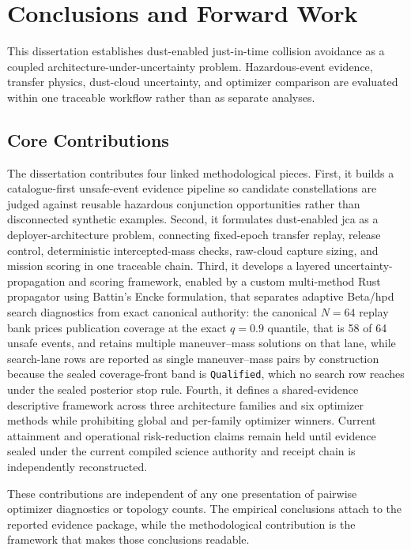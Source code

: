 \chapter{Conclusions and Forward Work} \label{ch:conclusions}

This dissertation establishes dust-enabled just-in-time collision avoidance as a coupled architecture-under-uncertainty problem. Hazardous-event evidence, transfer physics, dust-cloud uncertainty, and optimizer comparison are evaluated within one traceable workflow rather than as separate analyses.

\section{Core Contributions} \label{se:conclusions_contributions}

The dissertation contributes four linked methodological pieces. First, it builds a catalogue-first unsafe-event evidence pipeline so candidate constellations are judged against reusable hazardous conjunction opportunities rather than disconnected synthetic examples. Second, it formulates dust-enabled \gls{jca} as a deployer-architecture problem, connecting fixed-epoch transfer replay, release control, deterministic intercepted-mass checks, raw-cloud capture sizing, and mission scoring in one traceable chain. Third, it develops a layered uncertainty-propagation and scoring framework, enabled by a custom multi-method Rust propagator using Battin's Encke formulation, that separates adaptive Beta/\gls{hpd} search diagnostics from exact canonical authority: the canonical \(N=64\) replay bank prices publication coverage at the exact \(q=0.9\) quantile, that is 58 of 64 unsafe events, and retains multiple maneuver--mass solutions on that lane, while search-lane rows are reported as single maneuver--mass pairs by construction because the sealed coverage-front band is \texttt{Qualified}, which no search row reaches under the sealed posterior stop rule. Fourth, it defines a shared-evidence descriptive framework across three architecture families and six optimizer methods while prohibiting global and per-family optimizer winners. Current attainment and operational risk-reduction claims remain held until evidence sealed under the current compiled science authority and receipt chain is independently reconstructed.

These contributions are independent of any one presentation of pairwise optimizer diagnostics or topology counts. The empirical conclusions attach to the reported evidence package, while the methodological contribution is the framework that makes those conclusions readable.

